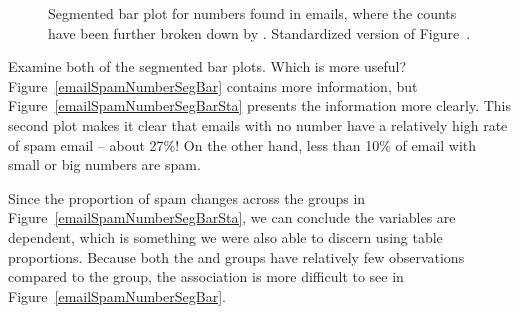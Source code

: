 \begin{figure}
\centering
{}
\caption{ Segmented bar plot for numbers found in emails, where the counts have been further broken down by .  Standardized version of Figure~.\textA{\vspace{-3mm}}}
\label{emailSpamNumberSegBarPlot}
\end{figure}

\begin{example}{Examine both of the segmented bar plots. Which is more useful?}
Figure~\ref{emailSpamNumberSegBar} contains more information, but Figure~\ref{emailSpamNumberSegBarSta} presents the information more clearly. This second plot makes it clear that emails with no number have a relatively high rate of spam email -- about 27\%! On the other hand, less than 10\% of email with small or big numbers are spam.
\end{example}

Since the proportion of spam changes across the groups in Figure~\ref{emailSpamNumberSegBarSta}, we can conclude the variables are dependent, which is something we were also able to discern using table proportions. Because both the  and  groups have relatively few observations compared to the  group, the association is more difficult to see in Figure~\ref{emailSpamNumberSegBar}.

